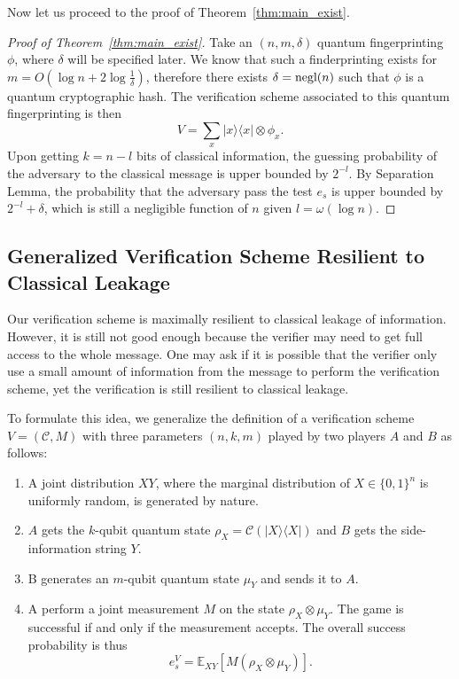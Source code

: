 Now let us proceed to the proof of Theorem~\ref{thm:main_exist}.
\begin{proof}[Proof of Theorem~\ref{thm:main_exist}]
    Take an $(n,m,\delta)$ quantum fingerprinting $\phi$, where $\delta$ will be specified later. We know that such a finderprinting exists for $m=O(\log n+2\log\frac1\delta)$, therefore there exists $\delta=\text{negl}(n)$ such that $\phi$ is a quantum cryptographic hash. The verification scheme associated to this quantum fingerprinting is then
    $$V=\sum_{x}|x\rangle\langle x|\otimes \phi_x.$$
    Upon getting $k = n-l$ bits of classical information, the guessing probability of the adversary to the classical message is upper bounded by $2^{-l}$. By Separation Lemma, the probability that the adversary pass the test $e_s$ is upper bounded by $2^{-l}+\delta$, which is still a negligible function of $n$ given $l=\omega(\log n)$.
\end{proof}
\subsection{Generalized Verification Scheme Resilient to Classical Leakage}
Our verification scheme is maximally resilient to classical leakage of information. However, it is still not good enough because the verifier may need to get full access to the whole message. One may ask if it is possible that the verifier only use a small amount of information from the message to perform the verification scheme, yet the verification is still resilient to classical leakage.

To formulate this idea, we generalize the definition of a verification scheme $V=(\mathcal{C},M)$ with
three parameters $(n,k,m)$ played by two players $A$ and
$B$ as follows:
\begin{enumerate}
    \item A joint distribution $XY$, where the marginal distribution of $X\in\{0,1\}^n$ is uniformly random, is generated by nature.
    \item $A$ gets the $k$-qubit quantum state $\rho_X=\mathcal{C}(|X\rangle\langle X|)$ and $B$ gets the side-information string $Y$.
    \item B generates an $m$-qubit quantum state $\mu_Y$ and sends it to $A$.
    \item A perform a joint measurement $M$ on the state $\rho_X\otimes \mu_Y$. The game is successful if and only if the measurement accepts. The overall success probability is thus
        $$e_s^V=\mathbb{E}_{XY}[M(\rho_X\otimes\mu_Y)].$$
\end{enumerate}

